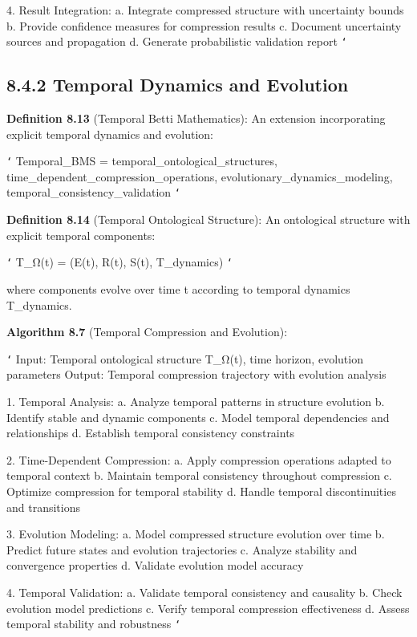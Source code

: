 4. Result Integration:
   a. Integrate compressed structure with uncertainty bounds
   b. Provide confidence measures for compression results
   c. Document uncertainty sources and propagation
   d. Generate probabilistic validation report
\texttt{`}

\subsection{8.4.2 Temporal Dynamics and Evolution}

\textbf{Definition 8.13} (Temporal Betti Mathematics): An extension incorporating explicit temporal dynamics and evolution:

\texttt{`}
Temporal_BMS = {
    temporal_ontological_structures,
    time_dependent_compression_operations,
    evolutionary_dynamics_modeling,
    temporal_consistency_validation
}
\texttt{`}

\textbf{Definition 8.14} (Temporal Ontological Structure): An ontological structure with explicit temporal components:

\texttt{`}
T_Ω(t) = (E(t), R(t), S(t), T_dynamics)
\texttt{`}

where components evolve over time t according to temporal dynamics T_dynamics.

\textbf{Algorithm 8.7} (Temporal Compression and Evolution):

\texttt{`}
Input: Temporal ontological structure T_Ω(t), time horizon, evolution parameters
Output: Temporal compression trajectory with evolution analysis

1. Temporal Analysis:
   a. Analyze temporal patterns in structure evolution
   b. Identify stable and dynamic components
   c. Model temporal dependencies and relationships
   d. Establish temporal consistency constraints
   
2. Time-Dependent Compression:
   a. Apply compression operations adapted to temporal context
   b. Maintain temporal consistency throughout compression
   c. Optimize compression for temporal stability
   d. Handle temporal discontinuities and transitions
   
3. Evolution Modeling:
   a. Model compressed structure evolution over time
   b. Predict future states and evolution trajectories
   c. Analyze stability and convergence properties
   d. Validate evolution model accuracy
   
4. Temporal Validation:
   a. Validate temporal consistency and causality
   b. Check evolution model predictions
   c. Verify temporal compression effectiveness
   d. Assess temporal stability and robustness
\texttt{`}

